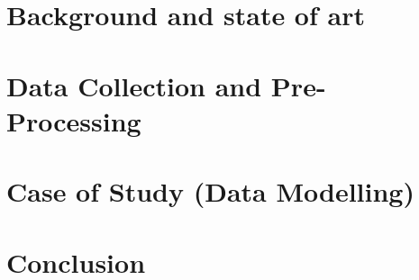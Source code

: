 \documentclass[fontsize=11pt,paper=a4,pagesize=auto]{report}
\begin{document}
\chapter{Background and state of art}


\chapter{Data Collection and Pre-Processing}


\chapter{Case of Study (Data Modelling) }


\chapter{Conclusion}




       
\end{document}
